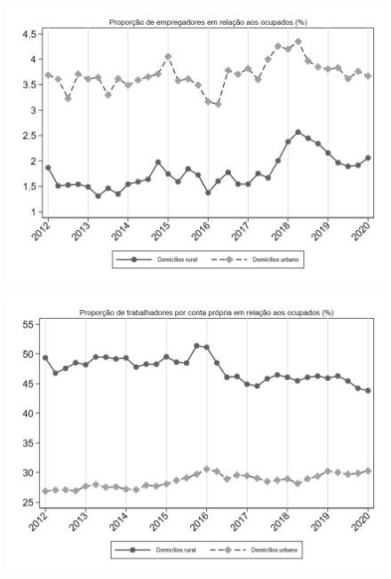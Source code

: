 \begin{frame}[label=_composicao_demografica_rural_urbano_prop_empregador]{}
\textit{\hyperlink{_composicao_demografica_rural_urbano}{}}
\begin{figure}
  \centering
  \includegraphics[width=1.0\linewidth]{../../analysis/output/composicao_demografica/area_geografica/_composicao_demografica_rural_urbano_prop_empregador.png}
  \caption{}
  \label{fig:_composicao_demografica_rural_urbano_prop_empregador}
\end{figure}
\end{frame}



\begin{frame}[label=_composicao_demografica_rural_urbano_prop_cpropria]{}
\textit{\hyperlink{_composicao_demografica_rural_urbano}{}}
\begin{figure}
  \centering
  \includegraphics[width=1.0\linewidth]{../../analysis/output/composicao_demografica/area_geografica/_composicao_demografica_rural_urbano_prop_cpropria.png}
  \caption{}
  \label{fig:_composicao_demografica_rural_urbano_prop_cpropria}
\end{figure}
\end{frame}

